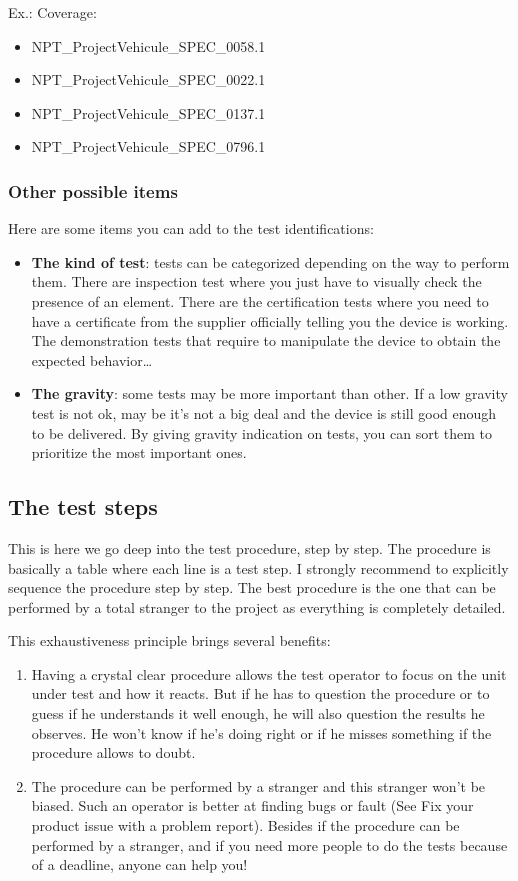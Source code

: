 Ex.: Coverage:
\begin{itemize}
    \item NPT\_ProjectVehicule\_SPEC\_0058.1
    \item NPT\_ProjectVehicule\_SPEC\_0022.1
    \item NPT\_ProjectVehicule\_SPEC\_0137.1
    \item NPT\_ProjectVehicule\_SPEC\_0796.1
\end{itemize}

\subsubsection{Other possible items}
Here are some items you can add to the test identifications:

\begin{itemize}
    \item \textbf{The kind of test}: tests can be categorized depending on the way to perform them. There are inspection test where you just have to visually check the presence of an element. There are the certification tests where you need to have a certificate from the supplier officially telling you the device is working. The demonstration tests that require to manipulate the device to obtain the expected behavior…
    \item \textbf{The gravity}: some tests may be more important than other. If a low gravity test is not ok, may be it’s not a big deal and the device is still good enough to be delivered. By giving gravity indication on tests, you can sort them to prioritize the most important ones.
\end{itemize}

\subsection{The test steps}
This is here we go deep into the test procedure, step by step. The procedure is basically a table where each line is a test step. I strongly recommend to explicitly sequence the procedure step by step. The best procedure is the one that can be performed by a total stranger to the project as everything is completely detailed.

This exhaustiveness principle brings several benefits:

\begin{enumerate}
    \item Having a crystal clear procedure allows the test operator to focus on the unit under test and how it reacts. But if he has to question the procedure or to guess if he understands it well enough, he will also question the results he observes. He won’t know if he’s doing right or if he misses something if the procedure allows to doubt.
    \item The procedure can be performed by a stranger and this stranger won’t be biased. Such an operator is better at finding bugs or fault (See Fix your product issue with a problem report). Besides if the procedure can be performed by a stranger, and if you need more people to do the tests because of a deadline, anyone can help you!
\end{enumerate}

